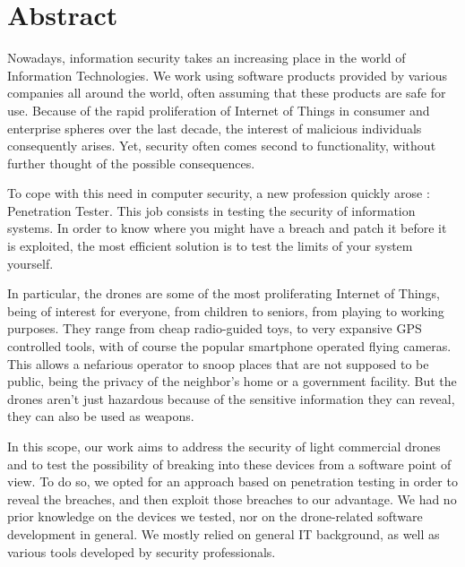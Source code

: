 \chapter*{Abstract}
\thispagestyle{empty}

\vspace{-3cm}
\vfill

\begin{center}
\begin{minipage}{15cm}
Nowadays, information security takes an increasing place in the world of Information Technologies. We work using software products provided by various companies all around the world, often assuming that these products are safe for use. Because of the rapid proliferation of Internet of Things in consumer and enterprise spheres over the last decade, the interest of malicious individuals consequently arises. Yet, security often comes second to functionality, without further thought of the possible consequences. 
\newline

To cope with this need in computer security, a new profession quickly arose : Penetration Tester. This job consists in testing the security of information systems. In order to know where you might have a breach and patch it before it is exploited, the most efficient solution is to test the limits of your system yourself.
\newline

In particular, the drones are some of the most proliferating Internet of Things, being of interest for everyone, from children to seniors, from playing to working purposes. They range from cheap radio-guided toys, to very expansive GPS controlled tools, with of course the popular smartphone operated flying cameras. This allows a nefarious operator to snoop places that are not supposed to be public, being the privacy of the neighbor's home or a government facility. But the drones aren't just hazardous because of the sensitive information they can reveal, they can also be used as weapons.
\newline

In this scope, our work aims to address the security of light commercial drones and to test the possibility of breaking into these devices from a software point of view. To do so, we opted for an approach based on penetration testing in order to reveal the breaches, and then exploit those breaches to our advantage. We had no prior knowledge on the devices we tested, nor on the drone-related software development in general. We mostly relied on general IT background, as well as various tools developed by security professionals.
\newline


\end{minipage}
\end{center}
